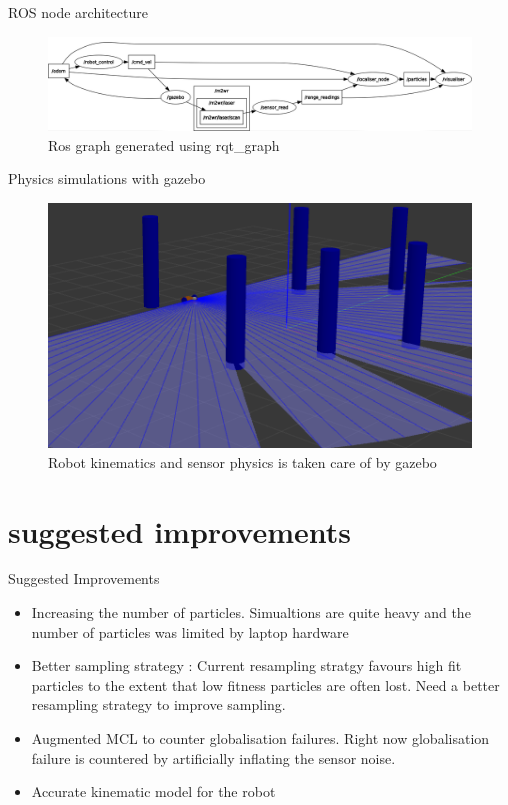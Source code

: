 \documentclass{beamer}
\begin{document}
\begin{frame}{ROS node architecture}
\begin{figure}
        \includegraphics[width = 120mm]{./rosgraph.png}
        \caption{Ros graph generated using rqt\_graph}
    \end{figure}
\end{frame}

\begin{frame}{Physics simulations with gazebo}
\begin{figure}
    \includegraphics[width = 120mm]{./physics.png}
        \caption{Robot kinematics and sensor physics is taken care of by gazebo}
    \end{figure}
\end{frame}

\section{suggested improvements}
\begin{frame}{Suggested Improvements}
    \begin{itemize}
        \item Increasing the number of particles. Simualtions are quite heavy and the number of particles was limited by laptop hardware
        \item Better sampling strategy : Current resampling stratgy favours high fit particles to the extent that low fitness particles are often lost. Need a better resampling strategy to improve sampling.
        \item Augmented MCL to counter globalisation failures. Right now globalisation failure is countered by artificially inflating the sensor noise.
        \item Accurate kinematic model for the robot
    \end{itemize}
\end{frame}
\end{document}
